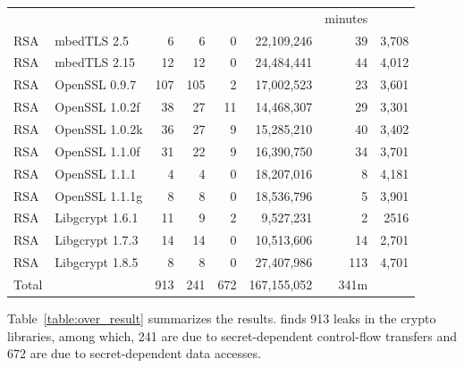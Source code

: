 \begin{table}
\begin{tabular}{llrrrrrr}
                       &                          &                   &                   &                &             & minutes         \\\cline{7-7}
    RSA                & mbedTLS 2.5              & 6                 & 6                 & 0              & 22,109,246  & 39      & 3,708 \\
    RSA                & mbedTLS 2.15             & 12                & 12                & 0              & 24,484,441  & 44      & 4,012 \\
    RSA                & OpenSSL 0.9.7            & 107               & 105               & 2              & 17,002,523  & 23      & 3,601 \\
    RSA                & OpenSSL 1.0.2f           & 38                & 27                & 11             & 14,468,307  & 29      & 3,301 \\
    RSA                & OpenSSL 1.0.2k           & 36                & 27                & 9              & 15,285,210  & 40      & 3,402 \\
    RSA                & OpenSSL 1.1.0f           & 31                & 22                & 9              & 16,390,750  & 34      & 3,701 \\
    RSA                & OpenSSL 1.1.1            & 4                 & 4                 & 0              & 18,207,016  & 8       & 4,181 \\
    RSA                & OpenSSL 1.1.1g           & 8                 & 8                 & 0              & 18,536,796  & 5       & 3,901 \\
    RSA                & Libgcrypt 1.6.1          & 11                & 9                 & 2              & 9,527,231   & 2       & 2516  \\
    RSA                & Libgcrypt 1.7.3          & 14                & 14                & 0              & 10,513,606  & 14      & 2,701 \\
    RSA                & Libgcrypt 1.8.5          & 8                 & 8                 & 0              & 27,407,986  & 113     & 4,701 \\

    Total              &                          & 913               & 241               & 672            & 167,155,052 & 341m            \\\hline
  \end{tabular}
\end{table}
Table~\ref{table:over_result} summarizes the results.
\detect{} finds 913 leaks in the crypto libraries,
among which, 241 are due to secret-dependent
control-flow transfers and 672 are due to secret-dependent data accesses.

